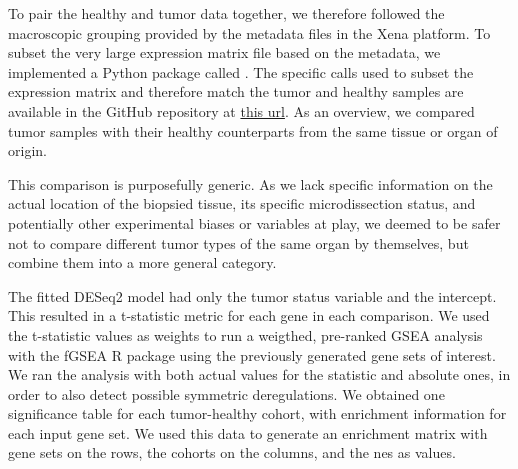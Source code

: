 To pair the healthy and tumor data together, we therefore followed the macroscopic grouping provided by the metadata files in the Xena platform.
To subset the very large expression matrix file based on the metadata, we implemented a Python package called .
The specific calls used to subset the expression matrix and therefore match the tumor and healthy samples are available in the GitHub repository at \href{https://github.com/CMA-Lab/transportome_profiler/blob/main/src/run_dea/tcga_gtex_queries.json}{this url}.
As an overview, we compared tumor samples with their healthy counterparts from the same tissue or organ of origin.

This comparison is purposefully generic.
As we lack specific information on the actual location of the biopsied tissue, its specific microdissection status, and potentially other experimental biases or variables at play, we deemed to be safer not to compare different tumor types of the same organ by themselves, but combine them into a more general category.


The fitted DESeq2 model had only the tumor status variable and the intercept.
This resulted in a t-statistic metric for each gene in each comparison.
We used the t-statistic values as weights to run a weigthed, pre-ranked GSEA analysis with the fGSEA R package \cite{korotkevichFastGeneSet2021} using the previously generated gene sets of interest.
We ran the analysis with both actual values for the statistic and absolute ones, in order to also detect possible symmetric deregulations.
We obtained one significance table for each tumor-healthy cohort, with enrichment information for each input gene set.
We used this data to generate an enrichment matrix with gene sets on the rows, the cohorts on the columns, and the \gls{nes} as values.

